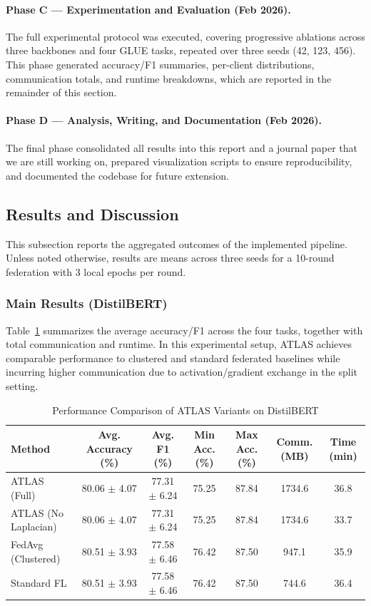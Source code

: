 \documentclass[11pt,a4paper]{article}
\begin{document}
\paragraph{Phase C --- Experimentation and Evaluation (Feb 2026).}
The full experimental protocol was executed, covering progressive ablations across three backbones and four GLUE tasks, repeated over three seeds (42, 123, 456). This phase generated accuracy/F1 summaries, per-client distributions, communication totals, and runtime breakdowns, which are reported in the remainder of this section.

\paragraph{Phase D --- Analysis, Writing, and Documentation (Feb 2026).}
The final phase consolidated all results into this report and a journal paper that we are still working on, prepared visualization scripts to ensure reproducibility, and documented the codebase for future extension.

\subsection{Results and Discussion}

This subsection reports the aggregated outcomes of the implemented pipeline. Unless noted otherwise, results are means across three seeds for a 10-round federation with 3 local epochs per round.

\subsubsection{Main Results (DistilBERT)}
Table~\ref{tab:main_results} summarizes the average accuracy/F1 across the four tasks, together with total communication and runtime. In this experimental setup, ATLAS achieves comparable performance to clustered and standard federated baselines while incurring higher communication due to activation/gradient exchange in the split setting.

\begin{table}[!t]
\renewcommand{\arraystretch}{1.2}
\caption{Performance Comparison of ATLAS Variants on DistilBERT}
\label{tab:main_results}
\centering
\begin{tabular}{l|cc|cc|cc}
\hline\hline
Method & Avg. Accuracy (\%) & Avg. F1 (\%) & Min Acc. (\%) & Max Acc. (\%) & Comm. (MB) & Time (min) \\
\hline
ATLAS (Full) & 80.06 $\pm$ 4.07 & 77.31 $\pm$ 6.24 & 75.25 & 87.84 & 1734.6 & 36.8 \\
ATLAS (No Laplacian) & 80.06 $\pm$ 4.07 & 77.31 $\pm$ 6.24 & 75.25 & 87.84 & 1734.6 & 33.7 \\
FedAvg (Clustered) & 80.51 $\pm$ 3.93 & 77.58 $\pm$ 6.46 & 76.42 & 87.50 & 947.1 & 35.9 \\
Standard FL & 80.51 $\pm$ 3.93 & 77.58 $\pm$ 6.46 & 76.42 & 87.50 & 744.6 & 36.4 \\
\hline\hline
\end{tabular}
\end{table}
\end{document}
